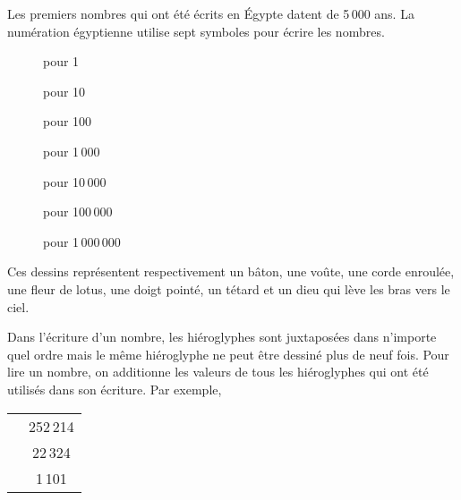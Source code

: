 Les premiers nombres qui ont été écrits en \'Egypte datent de 5\,000
ans. La numération égyptienne utilise sept symboles pour écrire les
nombres.
\begin{center}
  \begin{minipage}{0.8\linewidth}
\begin{multicols}{3}
\begin{description}
\item[\huge\textpmhg{\Hone}] pour 1
\item[\huge{}] pour 10
\item[\huge{}] pour 100
\item[\huge{}] pour 1\,000
\item[\huge{}] pour 10\,000
\item[\huge{}] pour 100\,000
\item[\huge{}] pour 1\,000\,000
\end{description}
\end{multicols}
  \end{minipage}
\end{center}
Ces dessins représentent respectivement un bâton, une voûte, une corde
enroulée, une fleur de lotus, une doigt pointé, un tétard et un dieu
qui lève les bras vers le ciel.
\par Dans l'écriture d'un nombre, les hiéroglyphes sont juxtaposées
dans n'importe quel ordre mais le même hiéroglyphe ne peut être
dessiné plus de neuf fois. Pour lire un nombre, on additionne les
valeurs de tous les hiéroglyphes qui ont été utilisés dans son
écriture. Par exemple,
\begin{center}
  \begin{tabular}{cc}
    {\huge\pmglyph{\HCthousand-\HCthousand-{{\HXthousand-\HXthousand-\HXthousand}+{\HXthousand-\HXthousand}}-\Hthousand-\Hthousand-\Hhundred-\Hhundred-\Hten-{{\Hone-\Hone}+{\Hone-\Hone}}}}&252\,214\\
    {\huge\pmglyph{{{\Hone-\Hone}+{\Hone-\Hone}}-\Hten-\Hten-\Hhundred-\Hhundred-\Hhundred-\Hthousand-\Hthousand-\HXthousand-\HXthousand}}&22\,324\\
    {\huge\pmglyph{\Hhundred-\Hone-\Hthousand}}&1\,101\\
  \end{tabular}
\end{center}
